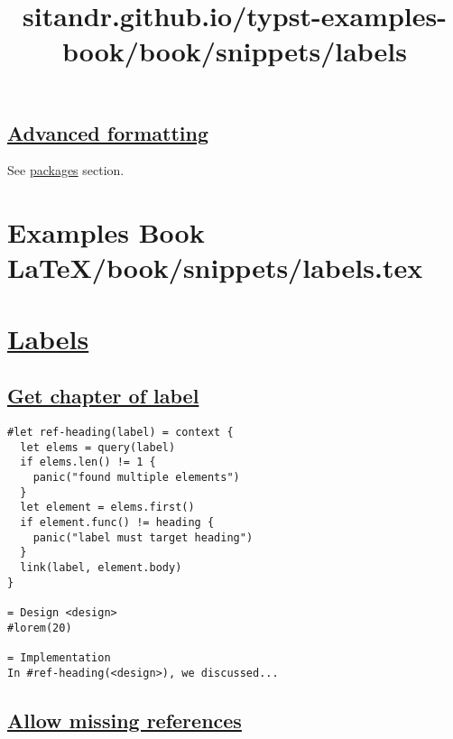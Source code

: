 \pandocbounded{}

\subsection{\texorpdfstring{\hyperref[advanced-formatting]{Advanced
formatting}}{Advanced formatting}}\label{advanced-formatting}

See \href{../packages/code.html}{packages} section.


\section{Examples Book LaTeX/book/snippets/labels.tex}
\title{sitandr.github.io/typst-examples-book/book/snippets/labels}

\section{\texorpdfstring{\hyperref[labels]{Labels}}{Labels}}\label{labels}

\subsection{\texorpdfstring{\hyperref[get-chapter-of-label]{Get chapter
of label}}{Get chapter of label}}\label{get-chapter-of-label}

\begin{verbatim}
#let ref-heading(label) = context {
  let elems = query(label)
  if elems.len() != 1 {
    panic("found multiple elements")
  }
  let element = elems.first()
  if element.func() != heading {
    panic("label must target heading")
  }
  link(label, element.body)
}

= Design <design>
#lorem(20)

= Implementation
In #ref-heading(<design>), we discussed...
\end{verbatim}

\pandocbounded{}

\subsection{\texorpdfstring{\hyperref[allow-missing-references]{Allow
missing
references}}{Allow missing references}}\label{allow-missing-references}

